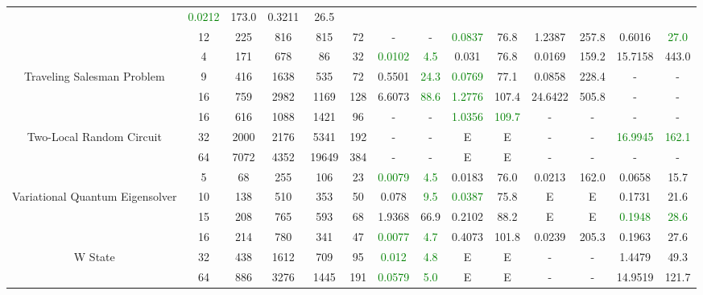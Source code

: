 \begin{table}[htb]
{\begin{tabular}{|c|c|c|c|c|c|c|c|c|c|c|c|c|c|}
 & \textcolor{green}{0.0212} & 173.0
 & 0.3211 & 26.5
 \\
 & 
12 & 225 & 816 & 815 & 72
 & - & -
 & \textcolor{green}{0.0837} & 76.8
 & 1.2387 & 257.8
 & 0.6016 & \textcolor{green}{27.0}
 \\
\hline
 & 
4 & 171 & 678 & 86 & 32
 & \textcolor{green}{0.0102} & \textcolor{green}{4.5}
 & 0.031 & 76.8
 & 0.0169 & 159.2
 & 15.7158 & 443.0
 \\
Traveling Salesman Problem & 
9 & 416 & 1638 & 535 & 72
 & 0.5501 & \textcolor{green}{24.3}
 & \textcolor{green}{0.0769} & 77.1
 & 0.0858 & 228.4
 & - & -
 \\
 & 
16 & 759 & 2982 & 1169 & 128
 & 6.6073 & \textcolor{green}{88.6}
 & \textcolor{green}{1.2776} & 107.4
 & 24.6422 & 505.8
 & - & -
 \\
\hline
 & 
16 & 616 & 1088 & 1421 & 96
 & - & -
 & \textcolor{green}{1.0356} & \textcolor{green}{109.7}
 & - & -
 & - & -
 \\
Two-Local Random Circuit & 
32 & 2000 & 2176 & 5341 & 192
 & - & -
 & E & E
 & - & -
 & \textcolor{green}{16.9945} & \textcolor{green}{162.1}
 \\
 & 
64 & 7072 & 4352 & 19649 & 384
 & - & -
 & E & E
 & - & -
 & - & -
 \\
\hline
 & 
5 & 68 & 255 & 106 & 23
 & \textcolor{green}{0.0079} & \textcolor{green}{4.5}
 & 0.0183 & 76.0
 & 0.0213 & 162.0
 & 0.0658 & 15.7
 \\
Variational Quantum Eigensolver & 
10 & 138 & 510 & 353 & 50
 & 0.078 & \textcolor{green}{9.5}
 & \textcolor{green}{0.0387} & 75.8
 & E & E
 & 0.1731 & 21.6
 \\
 & 
15 & 208 & 765 & 593 & 68
 & 1.9368 & 66.9
 & 0.2102 & 88.2
 & E & E
 & \textcolor{green}{0.1948} & \textcolor{green}{28.6}
 \\
\hline
 & 
16 & 214 & 780 & 341 & 47
 & \textcolor{green}{0.0077} & \textcolor{green}{4.7}
 & 0.4073 & 101.8
 & 0.0239 & 205.3
 & 0.1963 & 27.6
 \\
W State & 
32 & 438 & 1612 & 709 & 95
 & \textcolor{green}{0.012} & \textcolor{green}{4.8}
 & E & E
 & - & -
 & 1.4479 & 49.3
 \\
 & 
64 & 886 & 3276 & 1445 & 191
 & \textcolor{green}{0.0579} & \textcolor{green}{5.0}
 & E & E
 & - & -
 & 14.9519 & 121.7
 \\
\hline
\end{tabular}}
\end{table}